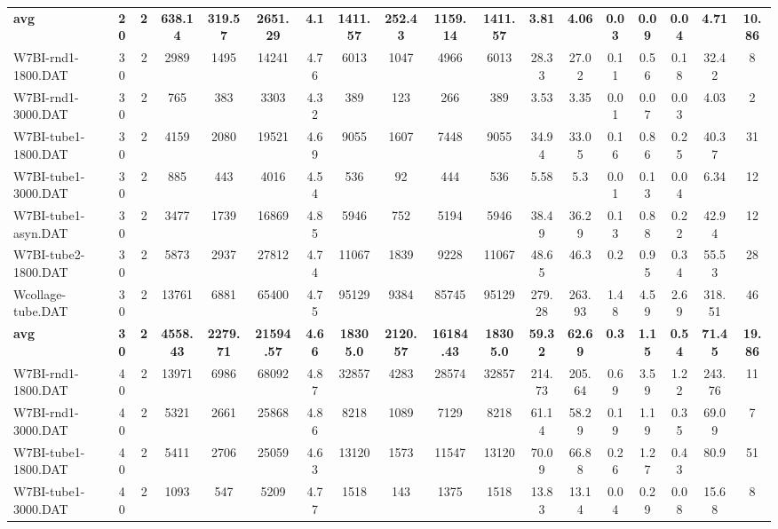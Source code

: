 \begin{sidewaystable}[h]
{\begin{tabular}{lccccccccccccccccc}
\cline{1-18} \textbf{avg} & \textbf{20} & \textbf{2} & \textbf{638.14} & \textbf{319.57} & \textbf{2651.29} & \textbf{4.1} & \textbf{1411.57} & \textbf{252.43} & \textbf{1159.14} & \textbf{1411.57} & \textbf{3.81} & \textbf{4.06} & \textbf{0.03} & \textbf{0.09} & \textbf{0.04} & \textbf{4.71} & \textbf{10.86} \\ \cline{1-18}
W7BI-rnd1-1800.DAT & 30 & 2 & 2989 & 1495 & 14241 & 4.76 & 6013 & 1047 & 4966 & 6013 & 28.33 & 27.02 & 0.11 & 0.56 & 0.18 & 32.42 & 8\\
W7BI-rnd1-3000.DAT & 30 & 2 & 765 & 383 & 3303 & 4.32 & 389 & 123 & 266 & 389 & 3.53 & 3.35 & 0.01 & 0.07 & 0.03 & 4.03 & 2\\
W7BI-tube1-1800.DAT & 30 & 2 & 4159 & 2080 & 19521 & 4.69 & 9055 & 1607 & 7448 & 9055 & 34.94 & 33.05 & 0.16 & 0.86 & 0.25 & 40.37 & 31\\
W7BI-tube1-3000.DAT & 30 & 2 & 885 & 443 & 4016 & 4.54 & 536 & 92 & 444 & 536 & 5.58 & 5.3 & 0.01 & 0.13 & 0.04 & 6.34 & 12\\
W7BI-tube1-asyn.DAT & 30 & 2 & 3477 & 1739 & 16869 & 4.85 & 5946 & 752 & 5194 & 5946 & 38.49 & 36.29 & 0.13 & 0.88 & 0.22 & 42.94 & 12\\
W7BI-tube2-1800.DAT & 30 & 2 & 5873 & 2937 & 27812 & 4.74 & 11067 & 1839 & 9228 & 11067 & 48.65 & 46.3 & 0.2 & 0.95 & 0.34 & 55.53 & 28\\
Wcollage-tube.DAT & 30 & 2 & 13761 & 6881 & 65400 & 4.75 & 95129 & 9384 & 85745 & 95129 & 279.28 & 263.93 & 1.48 & 4.59 & 2.69 & 318.51 & 46\\
\cline{1-18} \textbf{avg} & \textbf{30} & \textbf{2} & \textbf{4558.43} & \textbf{2279.71} & \textbf{21594.57} & \textbf{4.66} & \textbf{18305.0} & \textbf{2120.57} & \textbf{16184.43} & \textbf{18305.0} & \textbf{59.32} & \textbf{62.69} & \textbf{0.3} & \textbf{1.15} & \textbf{0.54} & \textbf{71.45} & \textbf{19.86} \\ \cline{1-18}
W7BI-rnd1-1800.DAT & 40 & 2 & 13971 & 6986 & 68092 & 4.87 & 32857 & 4283 & 28574 & 32857 & 214.73 & 205.64 & 0.69 & 3.59 & 1.22 & 243.76 & 11\\
W7BI-rnd1-3000.DAT & 40 & 2 & 5321 & 2661 & 25868 & 4.86 & 8218 & 1089 & 7129 & 8218 & 61.14 & 58.29 & 0.19 & 1.19 & 0.35 & 69.09 & 7\\
W7BI-tube1-1800.DAT & 40 & 2 & 5411 & 2706 & 25059 & 4.63 & 13120 & 1573 & 11547 & 13120 & 70.09 & 66.88 & 0.26 & 1.27 & 0.43 & 80.9 & 51\\
W7BI-tube1-3000.DAT & 40 & 2 & 1093 & 547 & 5209 & 4.77 & 1518 & 143 & 1375 & 1518 & 13.83 & 13.14 & 0.04 & 0.29 & 0.08 & 15.68 & 8\\

\end{tabular}}
\end{sidewaystable}
